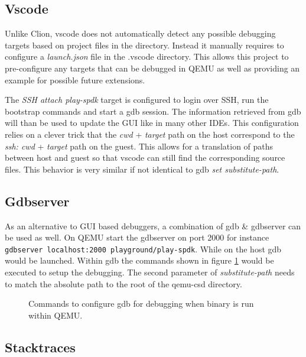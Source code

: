 \documentclass[conference]{IEEEtran}
\newcommand\bashstyle{
	\lstset{
		language=Bash,
		basicstyle=\ttm,
		showstringspaces=false,
		tabsize=2,
		aboveskip=0.2cm,
		belowskip=0.2cm,
		prebreak=\textbackslash,
		extendedchars=true,
		mathescape=false,
		linewidth=8.85cm,
		breaklines=true
	}
}
\newcommand\bashinline[1]{{\bashstyle\lstinline!#1!}}
\newcommand\bashexternal[2][]{{\bashstyle}}
\begin{document}
\subsection{Vscode}

Unlike Clion, vscode does not automatically detect any possible debugging
targets based on project files in the directory. Instead it manually requires to
configure a \textit{launch.json} file in the .vscode directory. This allows this
project to pre-configure any targets that can be debugged in QEMU as well as
providing an example for possible future extensions.

The \textit{SSH attach play-spdk} target is configured to login over SSH, run
the bootstrap commands and start a gdb session. The information retrieved from
gdb will than be used to update the GUI like in many other IDEs. This
configuration relies on a clever trick that the \textit{cwd} + \textit{target}
path on the host correspond to the \textit{ssh: cwd} + \textit{target} path on
the guest. This allows for a translation of paths between host and guest so
that vscode can  still find the corresponding source files. This behavior is
very similar if not identical to gdb \textit{set substitute-path}.

\subsection{Gdbserver}

As an alternative to GUI based debuggers, a combination of gdb \& gdbserver can
be used as well. On QEMU start the gdbserver on port 2000 for
instance\bashinline{gdbserver localhost:2000 playground/play-spdk}. While on the
host gdb would be launched. Within gdb the commands shown in
figure \ref{fig:gdb-qemu} would be executed to setup the debugging. The second
parameter of \textit{substitute-path} needs to match the absolute path to the
root of the qemu-csd directory.

\begin{center}
	\begin{figure}[H]
		\bashexternal{resources/bash/gdb-qemu.sh}
		\captionsetup{justification=centering}
		\caption{Commands to configure gdb for debugging when binary is run
			within QEMU.}
		\label{fig:gdb-qemu}
	\end{figure}
\end{center}

\subsection{Stacktraces}
\end{document}

